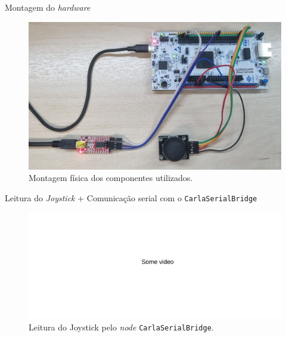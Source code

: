 \documentclass{if-beamer}
\begin{document}
\begin{frame}{Montagem do \textit{hardware}}
	
	\begin{figure}[H]
		\centering
		\includegraphics[width=0.8\linewidth]{montagem}
		\caption{Montagem física dos componentes utilizados.}
		\label{fig:somevideo}
	\end{figure}
	
	
	
\end{frame}

\begin{frame}{Leitura do \textit{Joystick} + Comunicação serial com o \texttt{CarlaSerialBridge}}
	
	\vspace{7mm}
	
	\begin{figure}[H]
		\centering
		\includegraphics[width=1\linewidth]{somevideo}
		\caption{Leitura do Joystick pelo \textit{node} \texttt{CarlaSerialBridge}.}
		\label{fig:somevideo}
	\end{figure}
	
\end{frame}       
\end{document}
